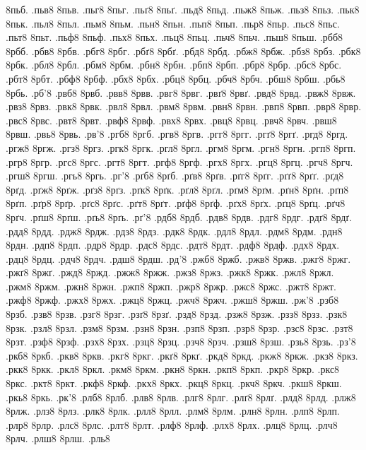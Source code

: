 {8пьб.
.пьв8
8пьв.
.пьг8
8пьг.
.пьґ8
8пьґ.
.пьд8
8пьд.
.пьж8
8пьж.
.пьз8
8пьз.
.пьк8
8пьк.
.пьл8
8пьл.
.пьм8
8пьм.
.пьн8
8пьн.
.пьп8
8пьп.
.пьр8
8пьр.
.пьс8
8пьс.
.пьт8
8пьт.
.пьф8
8пьф.
.пьх8
8пьх.
.пьц8
8пьц.
.пьч8
8пьч.
.пьш8
8пьш.
.рбб8
8рбб.
.рбв8
8рбв.
.рбг8
8рбг.
.рбґ8
8рбґ.
.рбд8
8рбд.
.рбж8
8рбж.
.рбз8
8рбз.
.рбк8
8рбк.
.рбл8
8рбл.
.рбм8
8рбм.
.рбн8
8рбн.
.рбп8
8рбп.
.рбр8
8рбр.
.рбс8
8рбс.
.рбт8
8рбт.
.рбф8
8рбф.
.рбх8
8рбх.
.рбц8
8рбц.
.рбч8
8рбч.
.рбш8
8рбш.
.рбь8
8рбь.
.рб'8
.рвб8
8рвб.
.рвв8
8рвв.
.рвг8
8рвг.
.рвґ8
8рвґ.
.рвд8
8рвд.
.рвж8
8рвж.
.рвз8
8рвз.
.рвк8
8рвк.
.рвл8
8рвл.
.рвм8
8рвм.
.рвн8
8рвн.
.рвп8
8рвп.
.рвр8
8рвр.
.рвс8
8рвс.
.рвт8
8рвт.
.рвф8
8рвф.
.рвх8
8рвх.
.рвц8
8рвц.
.рвч8
8рвч.
.рвш8
8рвш.
.рвь8
8рвь.
.рв'8
.ргб8
8ргб.
.ргв8
8ргв.
.ргг8
8ргг.
.ргґ8
8ргґ.
.ргд8
8ргд.
.ргж8
8ргж.
.ргз8
8ргз.
.ргк8
8ргк.
.ргл8
8ргл.
.ргм8
8ргм.
.ргн8
8ргн.
.ргп8
8ргп.
.ргр8
8ргр.
.ргс8
8ргс.
.ргт8
8ргт.
.ргф8
8ргф.
.ргх8
8ргх.
.ргц8
8ргц.
.ргч8
8ргч.
.ргш8
8ргш.
.ргь8
8ргь.
.рг'8
.рґб8
8рґб.
.рґв8
8рґв.
.рґг8
8рґг.
.рґґ8
8рґґ.
.рґд8
8рґд.
.рґж8
8рґж.
.рґз8
8рґз.
.рґк8
8рґк.
.рґл8
8рґл.
.рґм8
8рґм.
.рґн8
8рґн.
.рґп8
8рґп.
.рґр8
8рґр.
.рґс8
8рґс.
.рґт8
8рґт.
.рґф8
8рґф.
.рґх8
8рґх.
.рґц8
8рґц.
.рґч8
8рґч.
.рґш8
8рґш.
.рґь8
8рґь.
.рґ'8
.рдб8
8рдб.
.рдв8
8рдв.
.рдг8
8рдг.
.рдґ8
8рдґ.
.рдд8
8рдд.
.рдж8
8рдж.
.рдз8
8рдз.
.рдк8
8рдк.
.рдл8
8рдл.
.рдм8
8рдм.
.рдн8
8рдн.
.рдп8
8рдп.
.рдр8
8рдр.
.рдс8
8рдс.
.рдт8
8рдт.
.рдф8
8рдф.
.рдх8
8рдх.
.рдц8
8рдц.
.рдч8
8рдч.
.рдш8
8рдш.
.рд'8
.ржб8
8ржб.
.ржв8
8ржв.
.ржг8
8ржг.
.ржґ8
8ржґ.
.ржд8
8ржд.
.ржж8
8ржж.
.ржз8
8ржз.
.ржк8
8ржк.
.ржл8
8ржл.
.ржм8
8ржм.
.ржн8
8ржн.
.ржп8
8ржп.
.ржр8
8ржр.
.ржс8
8ржс.
.ржт8
8ржт.
.ржф8
8ржф.
.ржх8
8ржх.
.ржц8
8ржц.
.ржч8
8ржч.
.ржш8
8ржш.
.рж'8
.рзб8
8рзб.
.рзв8
8рзв.
.рзг8
8рзг.
.рзґ8
8рзґ.
.рзд8
8рзд.
.рзж8
8рзж.
.рзз8
8рзз.
.рзк8
8рзк.
.рзл8
8рзл.
.рзм8
8рзм.
.рзн8
8рзн.
.рзп8
8рзп.
.рзр8
8рзр.
.рзс8
8рзс.
.рзт8
8рзт.
.рзф8
8рзф.
.рзх8
8рзх.
.рзц8
8рзц.
.рзч8
8рзч.
.рзш8
8рзш.
.рзь8
8рзь.
.рз'8
.ркб8
8ркб.
.ркв8
8ркв.
.ркг8
8ркг.
.ркґ8
8ркґ.
.ркд8
8ркд.
.ркж8
8ркж.
.ркз8
8ркз.
.ркк8
8ркк.
.ркл8
8ркл.
.ркм8
8ркм.
.ркн8
8ркн.
.ркп8
8ркп.
.ркр8
8ркр.
.ркс8
8ркс.
.ркт8
8ркт.
.ркф8
8ркф.
.ркх8
8ркх.
.ркц8
8ркц.
.ркч8
8ркч.
.ркш8
8ркш.
.ркь8
8ркь.
.рк'8
.рлб8
8рлб.
.рлв8
8рлв.
.рлг8
8рлг.
.рлґ8
8рлґ.
.рлд8
8рлд.
.рлж8
8рлж.
.рлз8
8рлз.
.рлк8
8рлк.
.рлл8
8рлл.
.рлм8
8рлм.
.рлн8
8рлн.
.рлп8
8рлп.
.рлр8
8рлр.
.рлс8
8рлс.
.рлт8
8рлт.
.рлф8
8рлф.
.рлх8
8рлх.
.рлц8
8рлц.
.рлч8
8рлч.
.рлш8
8рлш.
.рль8
}
